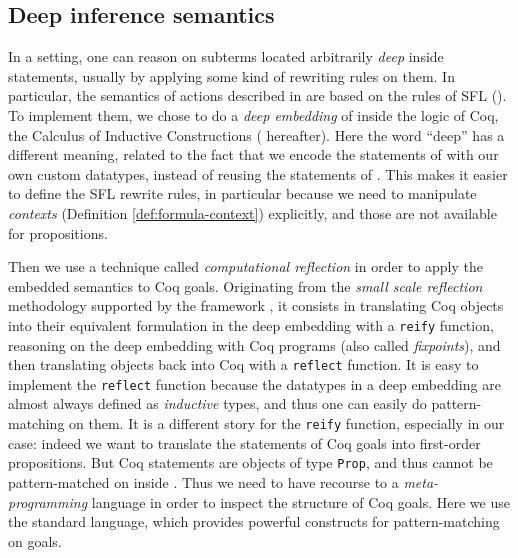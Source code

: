 \subsection{Deep inference semantics}

In a  setting, one can reason on subterms located arbitrarily
\emph{deep} inside statements, usually by applying some kind of rewriting rules
on them. In particular, the semantics of  actions described in 
are based on the rules of SFL (). To implement them, we chose to do
a \emph{deep embedding} of  inside the logic of Coq, the
Calculus of Inductive Constructions ( hereafter). Here the word
``deep'' has a different meaning, related to the fact that we encode the
statements of  with our own custom datatypes, instead of
reusing the statements of . This makes it easier to define the SFL
rewrite rules, in particular because we need to manipulate \emph{contexts}
(Definition \ref{def:formula-context}) explicitly, and those are not available
for  propositions.

Then we use a technique called \emph{computational reflection} in order to apply
the embedded  semantics to Coq goals. Originating from the
\emph{small scale reflection} methodology supported by the {\ssreflect}
framework \cite{SSR}, it consists in translating Coq objects into their
equivalent formulation in the deep embedding with a \texttt{reify} function,
reasoning on the deep embedding with Coq programs (also called
\emph{fixpoints}), and then translating objects back into Coq with a
\texttt{reflect} function. It is easy to implement the \texttt{reflect} function
because the datatypes in a deep embedding are almost always defined as
\emph{inductive} types, and thus one can easily do pattern-matching on them. It
is a different story for the \texttt{reify} function, especially in our case:
indeed we want to translate the statements of Coq goals into first-order
propositions. But Coq statements are objects of type \texttt{Prop}, and thus
cannot be pattern-matched on inside . Thus we
need to have recourse to a \emph{meta-programming} language in order to inspect
the structure of Coq goals. Here we use the standard {\ltac} language, which
provides powerful constructs for pattern-matching on goals.

